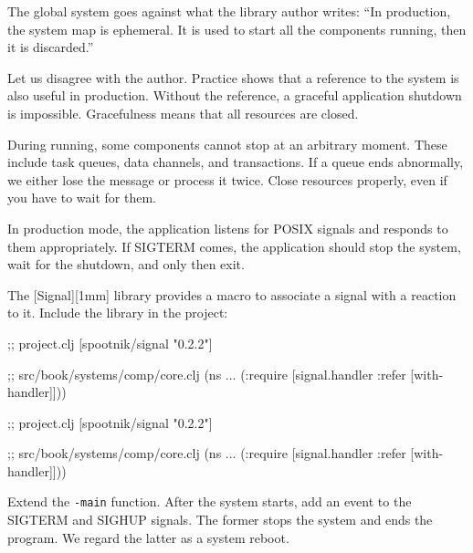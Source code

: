
The global system goes against what the library author writes: ``In production, the system map is ephemeral. It is used to start all the components running, then it is discarded.''


Let us disagree with the author. Practice shows that a reference to the system is also useful in production. Without the reference, a graceful application shutdown is impossible. Gracefulness means that all resources are closed.

During running, some components cannot stop at an arbitrary moment. These include task queues, data channels, and transactions. If a queue ends abnormally, we either lose the message or process it twice. Close resources properly, even if you have to wait for them.


In production mode, the application listens for POSIX signals and responds to them appropriately. If SIGTERM comes, the application should stop the system, wait for the shutdown, and only then exit.


The [Signal][1mm] library provides a macro to associate a signal with a reaction to it. Include the library in the project:

\ifnarrow

\begin{english}
  \begin{clojure}
;; project.clj
[spootnik/signal "0.2.2"]

;; src/book/systems/comp/core.clj
(ns ...
  (:require
   [signal.handler :refer
    [with-handler]]))
  \end{clojure}
\end{english}

\else

\begin{english}
  \begin{clojure}
;; project.clj
[spootnik/signal "0.2.2"]

;; src/book/systems/comp/core.clj
(ns ...
  (:require [signal.handler :refer [with-handler]]))
  \end{clojure}
\end{english}

\fi

Extend the \verb|-main| function. After the system starts, add an event to the SIGTERM and SIGHUP signals. The former stops the system and ends the program. We regard the latter as a system reboot.

